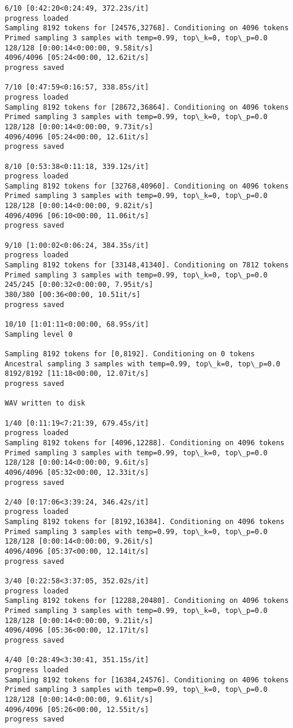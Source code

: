 \documentclass[11pt]{article}
\begin{document}
\begin{Verbatim}[commandchars=\\\{\}]
6/10 [0:42:20<0:24:49, 372.23s/it]
progress loaded
Sampling 8192 tokens for [24576,32768]. Conditioning on 4096 tokens
Primed sampling 3 samples with temp=0.99, top\_k=0, top\_p=0.0
128/128 [0:00:14<0:00:00, 9.58it/s]
4096/4096 [05:24<00:00, 12.62it/s]
progress saved

7/10 [0:47:59<0:16:57, 338.85s/it]
progress loaded
Sampling 8192 tokens for [28672,36864]. Conditioning on 4096 tokens
Primed sampling 3 samples with temp=0.99, top\_k=0, top\_p=0.0
128/128 [0:00:14<0:00:00, 9.73it/s]
4096/4096 [05:24<00:00, 12.61it/s]
progress saved

8/10 [0:53:38<0:11:18, 339.12s/it]
progress loaded
Sampling 8192 tokens for [32768,40960]. Conditioning on 4096 tokens
Primed sampling 3 samples with temp=0.99, top\_k=0, top\_p=0.0
128/128 [0:00:14<0:00:00, 9.82it/s]
4096/4096 [06:10<00:00, 11.06it/s]
progress saved

9/10 [1:00:02<0:06:24, 384.35s/it]
progress loaded
Sampling 8192 tokens for [33148,41340]. Conditioning on 7812 tokens
Primed sampling 3 samples with temp=0.99, top\_k=0, top\_p=0.0
245/245 [0:00:32<0:00:00, 7.95it/s]
380/380 [00:36<00:00, 10.51it/s]
progress saved

10/10 [1:01:11<0:00:00, 68.95s/it]
Sampling level 0

Sampling 8192 tokens for [0,8192]. Conditioning on 0 tokens
Ancestral sampling 3 samples with temp=0.99, top\_k=0, top\_p=0.0
8192/8192 [11:18<00:00, 12.07it/s]
progress saved

WAV written to disk

1/40 [0:11:19<7:21:39, 679.45s/it]
progress loaded
Sampling 8192 tokens for [4096,12288]. Conditioning on 4096 tokens
Primed sampling 3 samples with temp=0.99, top\_k=0, top\_p=0.0
128/128 [0:00:14<0:00:00, 9.6it/s]
4096/4096 [05:32<00:00, 12.33it/s]
progress saved

2/40 [0:17:06<3:39:24, 346.42s/it]
progress loaded
Sampling 8192 tokens for [8192,16384]. Conditioning on 4096 tokens
Primed sampling 3 samples with temp=0.99, top\_k=0, top\_p=0.0
128/128 [0:00:14<0:00:00, 9.26it/s]
4096/4096 [05:37<00:00, 12.14it/s]
progress saved

3/40 [0:22:58<3:37:05, 352.02s/it]
progress loaded
Sampling 8192 tokens for [12288,20480]. Conditioning on 4096 tokens
Primed sampling 3 samples with temp=0.99, top\_k=0, top\_p=0.0
128/128 [0:00:14<0:00:00, 9.21it/s]
4096/4096 [05:36<00:00, 12.17it/s]
progress saved

4/40 [0:28:49<3:30:41, 351.15s/it]
progress loaded
Sampling 8192 tokens for [16384,24576]. Conditioning on 4096 tokens
Primed sampling 3 samples with temp=0.99, top\_k=0, top\_p=0.0
128/128 [0:00:14<0:00:00, 9.61it/s]
4096/4096 [05:26<00:00, 12.55it/s]
progress saved


\end{Verbatim}
\end{document}
